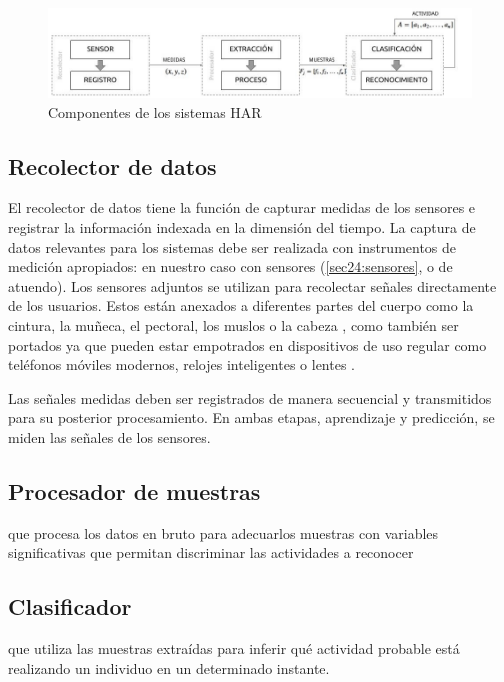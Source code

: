 \begin{figure}[!tbph]
\centering{}\includegraphics[width=1\linewidth]{capitulo-4/graphics/diagrama_4_1}\caption{Componentes de los sistemas HAR}
\label{fig41:componentes-har}
\end{figure}


\subsection{Recolector de datos}

El recolector de datos tiene la función de capturar medidas de los
sensores e registrar la información indexada en la dimensión del tiempo.
La captura de datos relevantes para los sistemas  debe
ser realizada con instrumentos de medición apropiados: en nuestro
caso con sensores (\ref{sec24:sensores}, o de atuendo).
Los sensores adjuntos se utilizan para recolectar señales directamente
de los usuarios. Estos están anexados a diferentes partes del cuerpo
como la cintura, la muñeca, el pectoral, los muslos o la cabeza \cite{Bao2004},
como también ser portados ya que pueden estar empotrados en dispositivos
de uso regular como teléfonos móviles modernos, relojes inteligentes
o lentes \cite{LaraLabrador2012,Choudhury2008}.

Las señales medidas deben ser registrados de manera secuencial y transmitidos
para su posterior procesamiento. En ambas etapas, aprendizaje y predicción,
se miden las señales de los sensores.

\subsection{Procesador de muestras}

que procesa los datos en bruto para adecuarlos muestras con variables
significativas que permitan discriminar las actividades a reconocer

\subsection{Clasificador}

que utiliza las muestras extraídas para inferir qué actividad probable
está realizando un individuo en un determinado instante.

